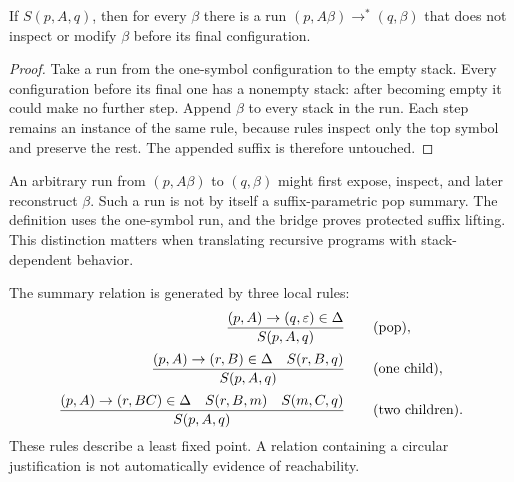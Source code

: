 \begin{lemma}
\label{lem:suffix}
If $S(p,A,q)$, then for every $\beta$ there is a run
$(p,A\beta)\longrightarrow^*(q,\beta)$ that does not inspect or modify
$\beta$ before its final configuration.
\end{lemma}
\begin{proof}
Take a run from the one-symbol configuration to the empty stack. Every
configuration before its final one has a nonempty stack: after becoming empty
it could make no further step. Append $\beta$ to every stack in the run. Each
step remains an instance of the same rule, because rules inspect only the top
symbol and preserve the rest. The appended suffix is therefore untouched.
\end{proof}

\begin{remark}
An arbitrary run from $(p,A\beta)$ to $(q,\beta)$ might first expose, inspect,
and later reconstruct $\beta$. Such a run is not by itself a suffix-parametric
pop summary. The definition uses the one-symbol run, and the bridge proves
protected suffix lifting. This distinction matters when translating recursive
programs with stack-dependent behavior.
\end{remark}

The summary relation is generated by three local rules:
\begin{align}
\frac{(p,A)\to(q,\varepsilon)\in\Delta}{S(p,A,q)}
&\qquad\text{(pop)},\label{eq:pop}\\[0.2em]
\frac{(p,A)\to(r,B)\in\Delta\quad S(r,B,q)}{S(p,A,q)}
&\qquad\text{(one child)},\label{eq:unary}\\[0.2em]
\frac{(p,A)\to(r,BC)\in\Delta\quad S(r,B,m)\quad S(m,C,q)}{S(p,A,q)}
&\qquad\text{(two children)}.\label{eq:binary}
\end{align}
These rules describe a least fixed point. A relation containing a circular
justification is not automatically evidence of reachability.


